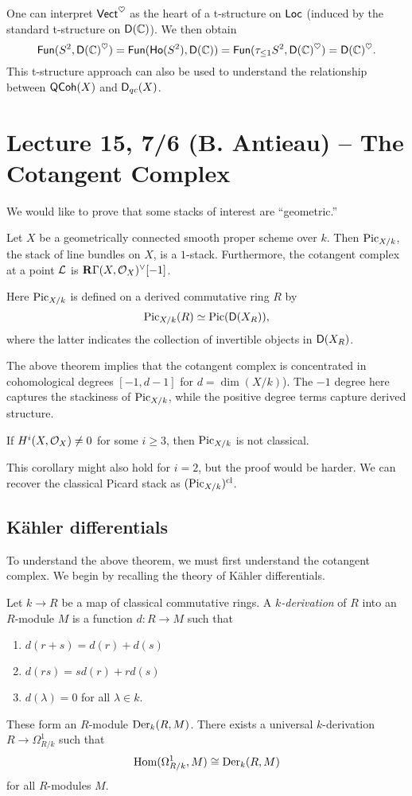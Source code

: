 \documentclass{amsart}
\begin{document}
One can interpret $\mathsf{Vect}^\heartsuit$ as the heart of a t-structure on $\mathsf{Loc}$ (induced by the standard t-structure on $\mathsf{D}(\mathbb{C})$).
We then obtain 
\[
	\mathsf{Fun}(S^2, \mathsf{D}(\mathbb{C})^\heartsuit) = \mathsf{Fun}(\mathsf{Ho}(S^2), \mathsf{D}(\mathbb{C})) = \mathsf{Fun}(\tau_{\leq 1} S^2, \mathsf{D}(\mathbb{C})^\heartsuit) = \mathsf{D}(\mathbb{C})^\heartsuit.
\]
This t-structure approach can also be used to understand the relationship between $\mathsf{QCoh}(X)$ and $\mathsf{D}_{qc}(X)$.

\section{Lecture 15, 7/6 (B. Antieau) -- The Cotangent Complex}

We would like to prove that some stacks of interest are ``geometric.''

\begin{thm}
	Let $X$ be a geometrically connected smooth proper scheme over $k$.
	Then $\operatorname{Pic}_{X/k}$, the stack of line bundles on $X$, is a $1$-stack.
	Furthermore, the cotangent complex at a point $\mathcal{L}$ is $\mathbf{R} \Gamma(X, \mathcal{O}_X)^\vee[-1]$.
\end{thm}

Here $\operatorname{Pic}_{X/k}$ is defined on a derived commutative ring $R$ by
\[
	\operatorname{Pic}_{X/k}(R) \simeq \operatorname{Pic}(\mathsf{D}(X_R)),
\]
where the latter indicates the collection of invertible objects in $\mathsf{D}(X_R)$.

The above theorem implies that the cotangent complex is concentrated in cohomological degrees $[-1, d-1]$ for $d = \dim (X / k)$).
The $-1$ degree here captures the stackiness of $\operatorname{Pic}_{X/k}$, while the positive degree terms capture derived structure.

\begin{cor}
	If $H^i(X, \mathcal{O}_X) \neq 0$ for some $i \geq 3$, then $\operatorname{Pic}_{X/k}$ is not classical.
\end{cor}

This corollary might also hold for $i = 2$, but the proof would be harder.
We can recover the classical Picard stack as $(\operatorname{Pic}_{X/k})^{\mathrm{cl}}$.

\subsection{K\"ahler differentials}

To understand the above theorem, we must first understand the cotangent complex.
We begin by recalling the theory of K\"ahler differentials.

\begin{dfn}
	Let $k \to R$ be a map of classical commutative rings.
	A \emph{$k$-derivation} of $R$ into an $R$-module $M$ is a function $d: R \to M$ such that
	\begin{enumerate}
		\item $d(r + s) = d(r) + d(s)$
		\item $d(rs) = s d(r) + r d(s)$
		\item $d(\lambda) = 0$ for all $\lambda \in k$.
	\end{enumerate}
	These form an $R$-module $\operatorname{Der}_k(R, M)$.
	There exists a universal $k$-derivation $R \to \Omega^1_{R/k}$ such that
	\[
		\operatorname{Hom}(\Omega^1_{R/k}, M) \cong \operatorname{Der}_k(R, M)
	\]
	for all $R$-modules $M$.
\end{dfn}
\end{document}
